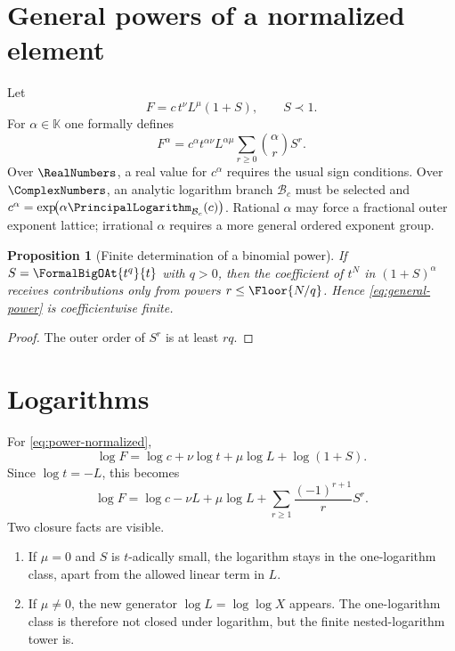 \documentclass[11pt,oneside]{book}
\newtheorem{proposition}[theorem]{Proposition}
\theoremstyle{definition}
\theoremstyle{remark}
\newcommand{\K}{\mathbb K}
\newcommand{\precdom}{\prec}
\newcommand{\LogarithmOnBranch}[2]{%
  \PrincipalLogarithm_{#1}\!\left(#2\right)%
}
\begin{document}
\section{General powers of a normalized element}
Let
\begin{equation}\label{eq:power-normalized}
 F=c\,t^\nu L^\mu(1+S),
 \qquad S\precdom1.
\end{equation}
For $\alpha\in\K$ one formally defines
\begin{equation}\label{eq:general-power}
 F^\alpha=c^\alpha t^{\alpha\nu}L^{\alpha\mu}
 \sum_{r\ge0}\binom{\alpha}{r}S^r.
\end{equation}
Over $\RealNumbers$, a real value for $c^\alpha$ requires the usual sign conditions.
Over $\ComplexNumbers$, an analytic logarithm branch $\mathcal B_c$ must be
selected and
$c^\alpha=\exp\!\bigl(\alpha\LogarithmOnBranch{\mathcal B_c}{c}\bigr)$.
Rational $\alpha$ may
force a fractional outer exponent lattice; irrational $\alpha$ requires a
more general ordered exponent group.

\begin{proposition}[Finite determination of a binomial power]
If $S=\FormalBigOAt{t^q}{t}$ with $q>0$, then the coefficient of $t^N$ in
$(1+S)^\alpha$ receives contributions only from powers
$r\le\Floor{N/q}$.  Hence \eqref{eq:general-power} is
coefficientwise finite.
\end{proposition}
\begin{proof}
The outer order of $S^r$ is at least $rq$.
\end{proof}

\section{Logarithms}
For \eqref{eq:power-normalized},
\begin{equation}\label{eq:log-normalized}
 \log F=\log c+\nu\log t+\mu\log L+\log(1+S).
\end{equation}
Since $\log t=-L$, this becomes
\begin{equation}\label{eq:log-normalized-expanded}
 \log F=\log c-\nu L+\mu\log L
 +\sum_{r\ge1}\frac{(-1)^{r+1}}rS^r.
\end{equation}
Two closure facts are visible.
\begin{enumerate}
\item If $\mu=0$ and $S$ is $t$-adically small, the logarithm stays in the
      one-logarithm class, apart from the allowed linear term in $L$.
\item If $\mu\ne0$, the new generator $\log L=\log\log X$ appears.  The
      one-logarithm class is therefore not closed under logarithm, but the
      finite nested-logarithm tower is.
\end{enumerate}
\end{document}
